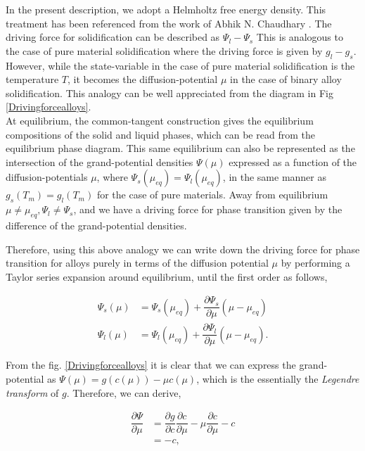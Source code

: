 \documentclass[12pt,a4paper]{report}
\begin{document}
  In the present description, we adopt a Helmholtz free energy density. This treatment has been 
	referenced from the work of Abhik N. Chaudhary \cite{Abhik_1}.
	The driving force for solidification can be described as $\Psi_l-\Psi_s$ This is analogous to the case of 
  pure material solidification where the driving force is given by $g_l-g_s$.  
  However, while the state-variable in the case of pure material solidification is the temperature $T$, 
  it becomes the diffusion-potential $\mu$ in the case of binary alloy solidification. This analogy 
  can be well appreciated from the diagram in Fig \ref{Drivingforcealloys}.\\
  
  At equilibrium, the common-tangent construction gives the equilibrium 
  compositions of the solid and liquid phases, which can be read from the 
  equilibrium phase diagram. This same equilibrium can also be represented 
  as the intersection of the grand-potential densities $\Psi\left(\mu\right)$ expressed as 
  a function of the diffusion-potentials $\mu$, where $\Psi_s\left(\mu_{eq}\right)=\Psi_l
  \left(\mu_{eq}\right)$, in the same manner as $g_s(T_m)= g_l(T_m)$ for the case of pure 
  materials. Away from equilibrium  $\mu\neq\mu_{eq}, \Psi_l\neq \Psi_s$, and we have a driving 
  force for phase transition given by the difference of the grand-potential densities.
  
  Therefore, using this above analogy we can write down the driving force
  for phase transition for alloys purely in terms of the diffusion potential 
  $\mu$ by performing a Taylor series expansion around equilibrium, until the 
  first order as follows, 
  
  \begin{align}
  \Psi_s\left(\mu\right) &= \Psi_s\left(\mu_{eq}\right) + \dfrac{\partial \Psi_s}{\partial \mu}\left(\mu-\mu_{eq}\right)\\
  \Psi_l\left(\mu\right) &= \Psi_l\left(\mu_{eq}\right) + \dfrac{\partial \Psi_l}{\partial \mu}\left(\mu-\mu_{eq}\right).
  \end{align}
  
  From the fig. \ref{Drivingforcealloys} it is clear that we can express the 
  grand-potential as $\Psi(\mu) = g(c(\mu)) -\mu c\left(\mu\right)$, which is the 
  essentially the \textit{Legendre transform} of $g$. Therefore, we can derive, 
  
  \begin{align}
   \dfrac{\partial \Psi}{\partial \mu} &= \dfrac{\partial g}{\partial c}\dfrac{\partial c}{\partial \mu} - \mu \dfrac{\partial c}{\partial \mu} -c\\
                                       &= -c,
  \end{align}
  
\end{document}
